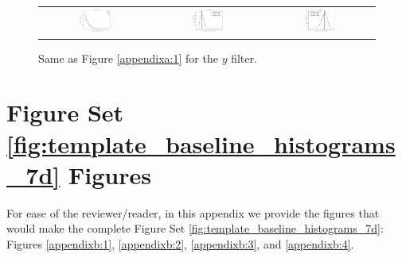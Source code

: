 \documentclass[preprintm,linenumbers]{aastex631}
\begin{document}
     \begin{figure}[h]
			\centering
			\begin{tabular}{c c c}
				
				\includegraphics[width=0.3\textwidth]{results/histograms_templates_tscale/hist_first_year_one_snap_v4_0_10yrs_db_noDD_noTwi_doALLTemplateMetrics_reduceNTemplate_y_noDD_noTwi.pdf} &
				\includegraphics[width=0.3\textwidth]{results/histograms_templates_tscale/hist_first_year_one_snap_v4_0_10yrs_db_noDD_noTwi_doALLTemplateMetrics_reduceSeeingTemplate_y_noDD_noTwi.pdf} &
				\includegraphics[width=0.3\textwidth]{results/histograms_templates_tscale/hist_first_year_one_snap_v4_0_10yrs_db_noDD_noTwi_doALLTemplateMetrics_reduceDepthTemplate_y_noDD_noTwi.pdf} \\
				
			\end{tabular}
			\caption{
				Same as Figure \ref{appendixa:1} for the $y$ filter.  
           \label{appendixa:6}
			}
		\end{figure}
		



		\section{Figure Set \ref{fig:template_baseline_histograms_7d} Figures}
		
		For ease of the reviewer/reader, in this appendix we provide the figures that would make the complete Figure Set \ref{fig:template_baseline_histograms_7d}: Figures \ref{appendixb:1}, \ref{appendixb:2}, \ref{appendixb:3}, and \ref{appendixb:4}. 
\end{document}
